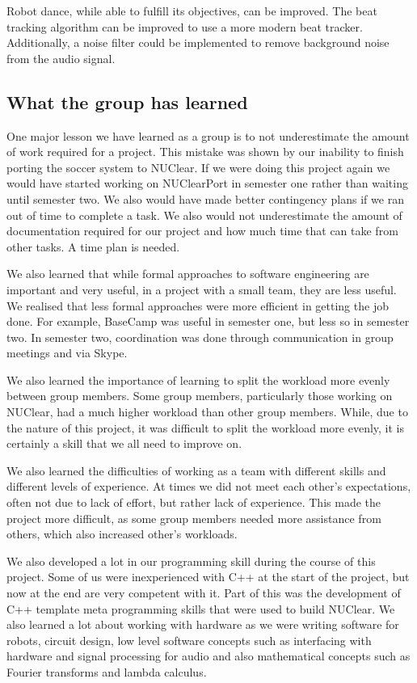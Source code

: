 \documentclass[english,12pt]{scrartcl}
\begin{document}
		Robot dance, while able to fulfill its objectives, can be improved.
		The beat tracking algorithm can be improved to use a more modern beat tracker.
		Additionally, a noise filter could be implemented to remove background noise from the audio signal. 
	
	\subsection{What the group has learned}
		One major lesson we have learned as a group is to not underestimate the amount of work required for a project.
		This mistake was shown by our inability to finish porting the soccer system to NUClear.
		If we were doing this project again we would have started working on NUClearPort in semester one rather than waiting until semester two.
		We also would have made better contingency plans if we ran out of time to complete a task.
		We also would not underestimate the amount of documentation required for our project and how much time that can take from other tasks.
		A time plan is needed. 

		We also learned that while formal approaches to software engineering are important and very useful, in a project with a small team, they are less useful.
		We realised that less formal approaches were more efficient in getting the job done.
		For example, BaseCamp was useful in semester one, but less so in semester two.
		In semester two, coordination was done through communication in group meetings and via Skype.

		We also learned the importance of learning to split the workload more evenly between group members.
		Some group members, particularly those working on NUClear, had a much higher workload than other group members.
		While, due to the nature of this project, it was difficult to split the workload more evenly, it is certainly a skill that we all need to improve on.

		We also learned the difficulties of working as a team with different skills and different levels of experience.
		At times we did not meet each other’s expectations, often not due to lack of effort, but rather lack of experience.
		This made the project more difficult, as some group members needed more assistance from others, which also increased other’s workloads.

		We also developed a lot in our programming skill during the course of this project.
		Some of us were inexperienced with C++ at the start of the project, but now at the end are very competent with it.
		Part of this was the development of C++ template meta programming skills that were used to build NUClear.
		We also learned a lot about working with hardware as we were writing software for robots, circuit design, low level software concepts such as interfacing with hardware and signal processing for audio and also mathematical concepts such as Fourier transforms and lambda calculus. 
		
\end{document}
